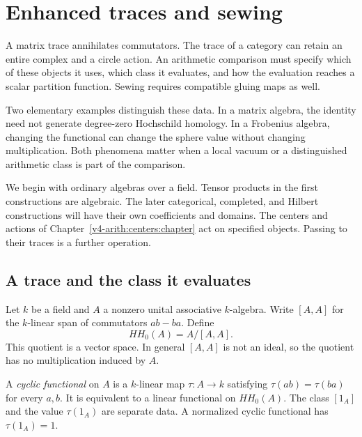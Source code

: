 \chapter{Enhanced traces and sewing}
\label{v4-arith:traces:chapter}

A matrix trace annihilates commutators. The trace of a category can retain
an entire complex and a circle action. An arithmetic comparison must specify
which of these objects it uses, which class it evaluates, and how the
evaluation reaches a scalar partition function. Sewing requires compatible
gluing maps as well.

Two elementary examples distinguish these data. In a matrix algebra, the
identity need not generate degree-zero Hochschild homology. In a Frobenius
algebra, changing the functional can change the sphere value without
changing multiplication. Both phenomena matter when a local vacuum or a
distinguished arithmetic class is part of the comparison.

We begin with ordinary algebras over a field. Tensor products in the first
constructions are algebraic. The later categorical, completed, and Hilbert
constructions will have their own coefficients and domains. The centers and
actions of Chapter~\ref{v4-arith:centers:chapter} act on specified objects.
Passing to their traces is a further operation.

\section{A trace and the class it evaluates}

Let $k$ be a field and $A$ a nonzero unital associative $k$-algebra. Write
$[A,A]$ for the $k$-linear span of commutators $ab-ba$. Define
\[
 HH_0(A)=A/[A,A].
\]
This quotient is a vector space. In general $[A,A]$ is not an ideal, so the
quotient has no multiplication induced by $A$.

A \emph{cyclic functional} on $A$ is a $k$-linear map $\tau:A\to k$
satisfying $\tau(ab)=\tau(ba)$ for every $a,b$. It is equivalent to a linear
functional on $HH_0(A)$. The class $[1_A]$ and the value $\tau(1_A)$ are
separate data. A normalized cyclic functional has $\tau(1_A)=1$.

